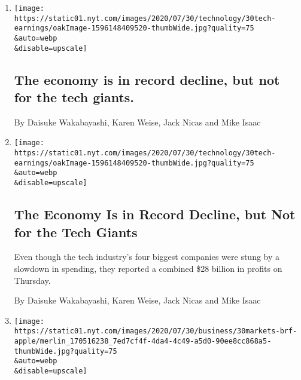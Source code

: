 \begin{enumerate}
\def\labelenumi{\arabic{enumi}.}
\item
  \href{/live/2020/07/31/business/stock-market-today-coronavirus/the-economy-is-in-record-decline-but-not-for-the-tech-giants}{}

  \texttt{[image: https://static01.nyt.com/images/2020/07/30/technology/30tech-earnings/oakImage-1596148409520-thumbWide.jpg?quality=75\\\&auto=webp\\\&disable=upscale]}

  \hypertarget{the-economy-is-in-record-decline-but-not-for-the-tech-giants}{%
  \subsection{The economy is in record decline, but not for the tech
  giants.}\label{the-economy-is-in-record-decline-but-not-for-the-tech-giants}}

  By Daisuke Wakabayashi, Karen Weise, Jack Nicas and Mike Isaac
\item
  \href{/2020/07/30/technology/tech-company-earnings-amazon-apple-facebook-google.html}{}

  \texttt{[image: https://static01.nyt.com/images/2020/07/30/technology/30tech-earnings/oakImage-1596148409520-thumbWide.jpg?quality=75\\\&auto=webp\\\&disable=upscale]}

  \hypertarget{the-economy-is-in-record-decline-but-not-for-the-tech-giants-1}{%
  \subsection{The Economy Is in Record Decline, but Not for the Tech
  Giants}\label{the-economy-is-in-record-decline-but-not-for-the-tech-giants-1}}

  Even though the tech industry's four biggest companies were stung by a
  slowdown in spending, they reported a combined \$28 billion in profits
  on Thursday.

  By Daisuke Wakabayashi, Karen Weise, Jack Nicas and Mike Isaac
\item
  \href{/live/2020/07/30/business/stock-market-today-coronavirus/apple-blows-past-expectations-with-surging-sales-and-profits}{}

  \texttt{[image: https://static01.nyt.com/images/2020/07/30/business/30markets-brf-apple/merlin\_170516238\_7ed7cf4f-4da4-4c49-a5d0-90ee8cc868a5-thumbWide.jpg?quality=75\\\&auto=webp\\\&disable=upscale]}

  \hypertarget{apple-blows-past-expectations-with-surging-sales-and-profits}{%
}
\end{enumerate}
